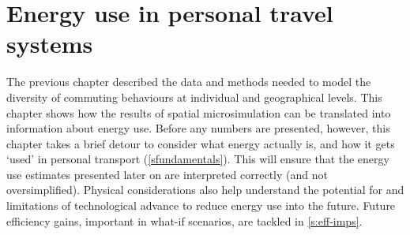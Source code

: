 \chapter{Energy use in personal travel systems} %
\label{Chapter5}
\fancyhead[RE,LO]{\thepage}
The previous chapter described the data and methods needed to model the
diversity of commuting behaviours at individual and geographical levels.
This chapter shows how the results of spatial microsimulation can be
translated into information about energy use. Before any numbers are
presented, however, this chapter takes a brief detour to consider what
energy actually is, and how it gets `used' in personal transport
(\cref{sfundamentals}). This will ensure that the energy use estimates
presented later on are
interpreted correctly (and not oversimplified). Physical considerations also
help understand the potential for and limitations of technological advance
to reduce energy use into the future\citep{MacKay2009}. Future
efficiency gains, important in what-if scenarios, are tackled in \cref{s:eff-imps}.

